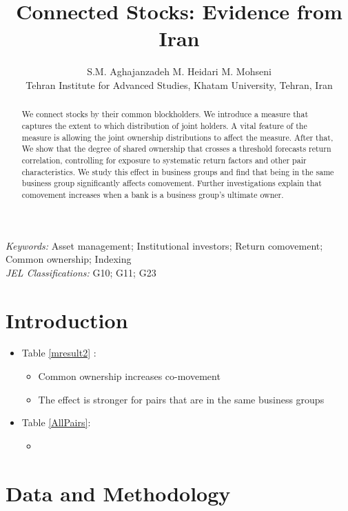 \documentclass[12pt, a4paper]{article}
\title{Connected Stocks: Evidence from Iran}
\author{S.M. Aghajanzadeh\sym{*} \qquad M. Heidari\sym{*} \qquad M. Mohseni\sym{*} \\
\sym{*} \footnotesize  Tehran Institute for Advanced Studies, Khatam University, Tehran, Iran
}
\begin{document}
\maketitle


\begin{abstract}
We connect stocks by their common blockholders. We introduce a measure that captures the extent to which distribution of joint holders. A vital feature of the measure is allowing the joint ownership distributions to affect the measure. After that, We show that the degree of shared ownership that crosses a threshold forecasts return correlation, controlling for exposure to systematic return factors and other pair characteristics. We study this effect in business groups and find that being in the same business group significantly affects comovement. Further investigations explain that comovement increases when a bank is a business group's ultimate owner.
\end{abstract}

\textit{Keywords:} Asset management; Institutional investors; Return comovement; Common
ownership; Indexing 
\\

\textit{JEL Classifications:} G10; G11; G23 



\section{Introduction}


\FloatBarrier

\begin{itemize}
	\item Table \ref{mresult2} :
	\begin{itemize}
		\item Common ownership increases co-movement 
		\item The effect is stronger for pairs that are in the same business groups
	\end{itemize}
\item Table \ref{AllPairs}:
\begin{itemize}
	\item 
\end{itemize}
\end{itemize}


\section{Data and Methodology}
\end{document}
